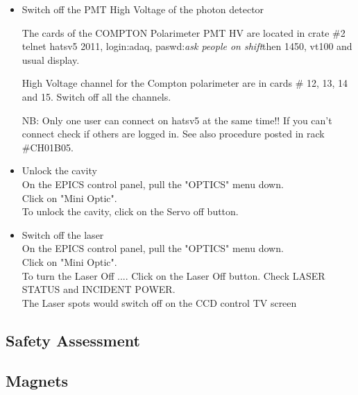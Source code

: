 {{\begin{itemize}
To make sure the detector is where you want watch the detector move on the TV screen (there is one 
in tha Hall A counting house and one in the back room). The switches readback must oscillate a 
little bit if the system is running properly.

\item  Switch off the PMT High Voltage of the photon detector\\
\par The cards of the COMPTON Polarimeter PMT HV are located in crate \#2
telnet hatsv5 2011, login:adaq, paswd:{\it ask people on shift}then 1450, vt100 and usual display.
\par High Voltage channel for the Compton polarimeter are in cards \# 12, 13, 14 and 15.
Switch off all the channels.
\par NB: Only one user can connect on hatsv5 at the same time!! If you can't connect 
check if others are logged in. See also procedure posted in rack \#CH01B05.

\item Unlock the cavity\\
On the EPICS control panel, pull the "OPTICS" menu down. \\
Click on "Mini Optic".\\
To unlock the cavity, click on the Servo off button.\\
\item Switch off the laser\\
On the EPICS control panel, pull the "OPTICS" menu down.\\
 Click on "Mini Optic".\\
 To turn the Laser Off .... Click on the Laser Off button.
 Check LASER STATUS and INCIDENT POWER.\\
 The Laser spots would switch off on the CCD control TV screen
\end {itemize}
} %

\begin{safetyen}{0}{0}
\section {Safety Assessment}
\label{sec:compton_safety}
\end{safetyen}

\begin{safetyen}{10}{15}
\subsection{Magnets}


\end{safetyen}}
